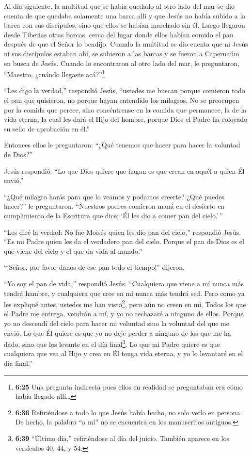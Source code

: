  Al día siguiente, la multitud que se había quedado al otro
lado del mar se dio cuenta de que quedaba solamente una barca allí y que
Jesús no había subido a la barca con sus discípulos, sino que ellos se
habían marchado sin él.  Luego llegaron desde Tiberias
otras barcas, cerca del lugar donde ellos habían comido el pan después
de que el Señor lo bendijo.  Cuando la multitud se dio
cuenta que ni Jesús ni sus discípulos estaban ahí, se subieron a las
barcas y se fueron a Capernaúm en busca de Jesús.  Cuando
lo encontraron al otro lado del mar, le preguntaron, ``Maestro, ¿cuándo
llegaste acá?''\footnote{\textbf{6:25} Una pregunta indirecta pues ellos
  en realidad se preguntaban era cómo había llegado allí\ldots{}}

 ``Les digo la verdad,'' respondió Jesús, ``ustedes me
buscan porque comieron todo el pan que quisieron, no porque hayan
entendido los milagros.  No se preocupen por la comida que
perece, sino concéntrense en la comida que permanece, la de la vida
eterna, la cual les dará el Hijo del hombre, porque Dios el Padre ha
colocado su sello de aprobación en él.''

 Entonces ellos le preguntaron: ``¿Qué tenemos que hacer
para hacer la voluntad de Dios?''

 Jesús respondió: ``Lo que Dios quiere que hagan es que
crean en aquél a quien Él envió.''

 ``¿Qué milagro harás para que lo veamos y podamos creerte?
¿Qué puedes hacer?'' le preguntaron.  ``Nuestros padres
comieron maná en el desierto en cumplimiento de la Escritura que dice:
`Él les dio a comer pan del cielo.'\,''

 ``Les diré la verdad: No fue Moisés quien les dio pan del
cielo,'' respondió Jesús. ``Es mi Padre quien les da el verdadero pan
del cielo.  Porque el pan de Dios es el que viene del cielo
y el que da vida al mundo.''

 ``¡Señor, por favor danos de ese pan todo el tiempo!''
dijeron.

 ``Yo soy el pan de vida,'' respondió Jesús. ``Cualquiera
que viene a mí nunca más tendrá hambre, y cualquiera que cree en mí
nunca más tendrá sed.  Pero como ya les expliqué antes,
ustedes me han visto\footnote{\textbf{6:36} Refiriéndose a todo lo que
  Jesús había hecho, no solo verlo en persona. De hecho, la palabra ``a
  mí'' no se encuentra en los manuscritos antiguos.}, pero aún no creen
en mí.  Todos los que el Padre me entrega, vendrán a mí, y
yo no rechazaré a ninguno de ellos.  Porque yo no descendí
del cielo para hacer mi voluntad sino la voluntad del que me envió.
 Lo que Él quiere es que yo no deje perder a ninguno de los
que me ha dado, sino que los levante en el día final\footnote{\textbf{6:39}
  ``Último día,'' refiriéndose al día del juicio. También aparece en los
  versículos 40, 44, y 54.}.  Lo que mi Padre quiere es que
cualquiera que vea al Hijo y crea en Él tenga vida eterna, y yo lo
levantaré en el día final.''

